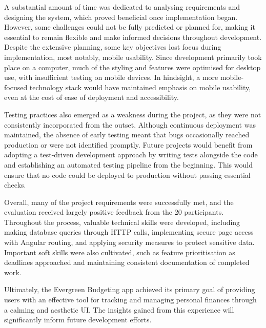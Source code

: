 \documentclass{l4proj}
\begin{document}
A substantial amount of time was dedicated to analysing requirements and designing the system, which proved beneficial once implementation began. However, some challenges could not be fully predicted or planned for, making it essential to remain flexible and make informed decisions throughout development. Despite the extensive planning, some key objectives lost focus during implementation, most notably, mobile usability. Since development primarily took place on a computer, much of the styling and features were optimised for desktop use, with insufficient testing on mobile devices. In hindsight, a more mobile-focused technology stack would have maintained emphasis on mobile usability, even at the cost of ease of deployment and accessibility.

Testing practices also emerged as a weakness during the project, as they were not consistently incorporated from the outset. Although continuous deployment was maintained, the absence of early testing meant that bugs occasionally reached production or were not identified promptly. Future projects would benefit from adopting a test-driven development approach by writing tests alongside the code and establishing an automated testing pipeline from the beginning. This would ensure that no code could be deployed to production without passing essential checks.

Overall, many of the project requirements were successfully met, and the evaluation received largely positive feedback from the 20 participants. Throughout the process, valuable technical skills were developed, including making database queries through HTTP calls, implementing secure page access with Angular routing, and applying security measures to protect sensitive data. Important soft skills were also cultivated, such as feature prioritisation as deadlines approached and maintaining consistent documentation of completed work.

Ultimately, the Evergreen Budgeting app achieved its primary goal of providing users with an effective tool for tracking and managing personal finances through a calming and aesthetic UI. The insights gained from this experience will significantly inform future development efforts.

%
% 
\end{document}
